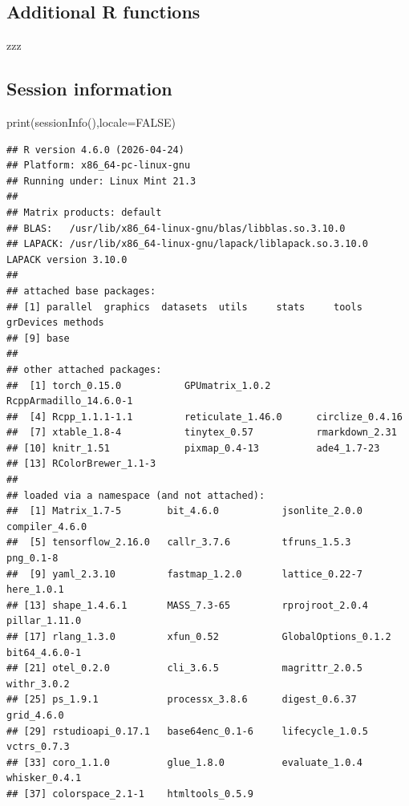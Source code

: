 \documentclass[
  10pt,
]{article}
\newenvironment{Shaded}{\begin{snugshade}}{\end{snugshade}}
\newcommand{\NormalTok}[1]{#1}
\begin{document}
\subsection{Additional R functions}\label{additional-r-functions}

zzz

\subsection{Session information}\label{session-information}

\begin{Shaded}
\begin{Highlighting}[]
\NormalTok{print(sessionInfo(),locale=FALSE)}
\end{Highlighting}
\end{Shaded}

\begin{verbatim}
## R version 4.6.0 (2026-04-24)
## Platform: x86_64-pc-linux-gnu
## Running under: Linux Mint 21.3
## 
## Matrix products: default
## BLAS:   /usr/lib/x86_64-linux-gnu/blas/libblas.so.3.10.0 
## LAPACK: /usr/lib/x86_64-linux-gnu/lapack/liblapack.so.3.10.0  LAPACK version 3.10.0
## 
## attached base packages:
## [1] parallel  graphics  datasets  utils     stats     tools     grDevices methods  
## [9] base     
## 
## other attached packages:
##  [1] torch_0.15.0           GPUmatrix_1.0.2        RcppArmadillo_14.6.0-1
##  [4] Rcpp_1.1.1-1.1         reticulate_1.46.0      circlize_0.4.16       
##  [7] xtable_1.8-4           tinytex_0.57           rmarkdown_2.31        
## [10] knitr_1.51             pixmap_0.4-13          ade4_1.7-23           
## [13] RColorBrewer_1.1-3    
## 
## loaded via a namespace (and not attached):
##  [1] Matrix_1.7-5        bit_4.6.0           jsonlite_2.0.0      compiler_4.6.0     
##  [5] tensorflow_2.16.0   callr_3.7.6         tfruns_1.5.3        png_0.1-8          
##  [9] yaml_2.3.10         fastmap_1.2.0       lattice_0.22-7      here_1.0.1         
## [13] shape_1.4.6.1       MASS_7.3-65         rprojroot_2.0.4     pillar_1.11.0      
## [17] rlang_1.3.0         xfun_0.52           GlobalOptions_0.1.2 bit64_4.6.0-1      
## [21] otel_0.2.0          cli_3.6.5           magrittr_2.0.5      withr_3.0.2        
## [25] ps_1.9.1            processx_3.8.6      digest_0.6.37       grid_4.6.0         
## [29] rstudioapi_0.17.1   base64enc_0.1-6     lifecycle_1.0.5     vctrs_0.7.3        
## [33] coro_1.1.0          glue_1.8.0          evaluate_1.0.4      whisker_0.4.1      
## [37] colorspace_2.1-1    htmltools_0.5.9
\end{verbatim}
\end{document}
